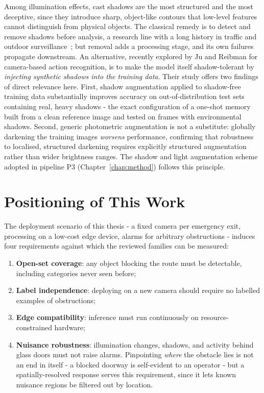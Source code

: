 Among illumination effects, cast shadows are the most structured and the most
deceptive, since they introduce sharp, object-like contours that low-level
features cannot distinguish from physical objects. The classical remedy is to
detect and remove shadows before analysis, a research line with a long history
in traffic and outdoor surveillance~\cite{Sanin2012}; but removal adds a processing stage,
and its own failures propagate downstream. An alternative, recently explored
by Ju and Reibman \cite{JuReibman2024} for camera-based action recognition, is
to make the model itself shadow-tolerant by \emph{injecting synthetic shadows
into the training data}. Their study offers two findings of direct relevance
here. First, shadow augmentation applied to shadow-free training data
substantially improves accuracy on out-of-distribution test sets containing
real, heavy shadows - the exact configuration of a one-shot memory built from a
clean reference image and tested on frames with environmental shadows. Second,
generic photometric augmentation is not a substitute: globally darkening the
training images \emph{worsens} performance, confirming that robustness to
localised, structured darkening requires explicitly structured augmentation
rather than wider brightness ranges. The shadow and light augmentation scheme
adopted in pipeline P3 (Chapter~\ref{chap:method}) follows this principle.

\section{Positioning of This Work}
\label{sec:sota-positioning}

The deployment scenario of this thesis - a fixed camera per emergency exit,
processing on a low-cost edge device, alarms for arbitrary obstructions -
induces four requirements against which the reviewed families can be measured:

\begin{enumerate}
  \item \textbf{Open-set coverage}: any object blocking the route must be
  detectable, including categories never seen before;
  \item \textbf{Label independence}: deploying on a new camera should require
  no labelled examples of obstructions;
  \item \textbf{Edge compatibility}: inference must run continuously on
  resource-constrained hardware;
  \item \textbf{Nuisance robustness}: illumination changes, shadows, and
  activity behind glass doors must not raise alarms. Pinpointing \emph{where}
  the obstacle lies is not an end in itself - a blocked doorway is self-evident
  to an operator - but a spatially-resolved response serves this requirement,
  since it lets known nuisance regions be filtered out by location.
\end{enumerate}

